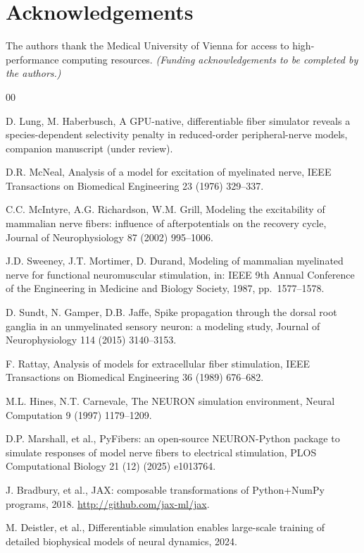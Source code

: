 \documentclass[preprint,12pt,a4paper]{elsarticle}
\begin{document}
\section*{Acknowledgements}

The authors thank the Medical University of Vienna for access to high-performance computing
resources. \emph{(Funding acknowledgements to be completed by the authors.)}

\begin{thebibliography}{00}

 D. Lung, M. Haberbusch, A GPU-native, differentiable fiber simulator reveals
a species-dependent selectivity penalty in reduced-order peripheral-nerve models, companion
manuscript (under review).

 D.R. McNeal, Analysis of a model for excitation of myelinated nerve, IEEE
Transactions on Biomedical Engineering 23 (1976) 329--337.

 C.C. McIntyre, A.G. Richardson, W.M. Grill, Modeling the excitability of
mammalian nerve fibers: influence of afterpotentials on the recovery cycle, Journal of
Neurophysiology 87 (2002) 995--1006.

 J.D. Sweeney, J.T. Mortimer, D. Durand, Modeling of mammalian myelinated nerve
for functional neuromuscular stimulation, in: IEEE 9th Annual Conference of the Engineering in
Medicine and Biology Society, 1987, pp.\ 1577--1578.

 D. Sundt, N. Gamper, D.B. Jaffe, Spike propagation through the dorsal root
ganglia in an unmyelinated sensory neuron: a modeling study, Journal of Neurophysiology 114
(2015) 3140--3153.

 F. Rattay, Analysis of models for extracellular fiber stimulation, IEEE
Transactions on Biomedical Engineering 36 (1989) 676--682.

 M.L. Hines, N.T. Carnevale, The NEURON simulation environment, Neural
Computation 9 (1997) 1179--1209.

 D.P. Marshall, et al., PyFibers: an open-source NEURON-Python package to
simulate responses of model nerve fibers to electrical stimulation, PLOS Computational Biology
21 (12) (2025) e1013764.

 J. Bradbury, et al., JAX: composable transformations of Python+NumPy programs,
2018. \url{http://github.com/jax-ml/jax}.

 M. Deistler, et al., Differentiable simulation enables large-scale training of
detailed biophysical models of neural dynamics, 2024.


\end{thebibliography}
\end{document}
